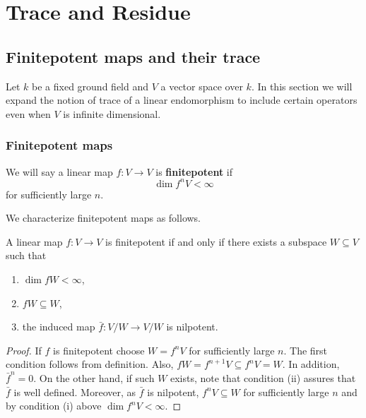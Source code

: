 \chapter{Trace and Residue}\label{ch:trace-and-residue}
\section{Finitepotent maps and their trace}
Let $k$ be a fixed ground field and $V$ a vector space over $k$. In this section we will expand the notion of trace of a linear endomorphism to include certain operators even when $V$ is infinite dimensional.
\subsection*{Finitepotent maps}
\begin{definition}\label{def:finitepotent}
	We will say a linear map $f\colon V \to V$ is \textbf{finitepotent} if
	\[
		\dim f^{n}V < \infty
	\]
	for sufficiently large $n$.
\end{definition}
We characterize finitepotent maps as follows.
\begin{lemma}\label{lemm:characterization-of-finitepotent-maps}
	A linear map $f\colon V \to V$ is finitepotent if and only if there exists a subspace $W \subseteq V$ such that
	\begin{enumerate}[label = (\roman*)]
		\item $\dim f W < \infty$,
		\item $f W \subseteq W$,
		\item the induced map $\bar{f}\colon V/W \to V/W$ is nilpotent.
	\end{enumerate}
\end{lemma}
\begin{proof}
	If $f$ is finitepotent choose $W = f^{n}V$ for sufficiently large $n$. The first condition follows from definition. Also, $f W = f^{n+1}V \subseteq f^{n}V = W$. In addition, $\bar{f}^{n} = 0$. On the other hand, if such $W$ exists, note that condition (ii) assures that $\bar{f}$ is well defined. Moreover, as $\bar{f}$ is nilpotent, $f^{n}V \subseteq W$ for sufficiently large $n$ and by condition (i) above $\dim f^{n} V < \infty$.
\end{proof}
